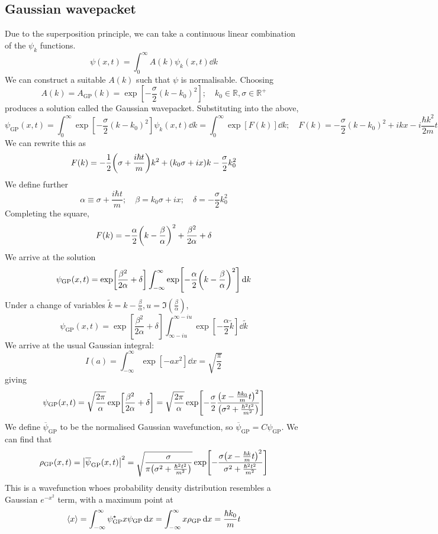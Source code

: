 \subsection{Gaussian wavepacket}
Due to the superposition principle, we can take a continuous linear combination of the \( \psi_k \) functions.
\[
	\psi(x,t) = \int_0^\infty A(k) \psi_k(x,t) \dd{k}
\]
We can construct a suitable \( A(k) \) such that \( \psi \) is normalisable.
Choosing
\[
	A(k) = A_{\text{GP}}(k) = \exp[-\frac{\sigma}{2}(k-k_0)^2];\quad k_0 \in \mathbb R, \sigma \in \mathbb R^+
\]
produces a solution called the Gaussian wavepacket.
Substituting into the above,
\[
	\psi_{\text{GP}}(x,t) = \int_0^\infty \exp[-\frac{\sigma}{2}(k-k_0)^2] \psi_k(x,t) \dd{k} = \int_0^\infty \exp[F(k)] \dd{k};\quad F(k) = -\frac{\sigma}{2}(k-k_0)^2 + ikx - i \frac{\hbar k^2}{2m} t
\]
We can rewrite this as
\[
	F(k) = -\frac{1}{2}\qty(\sigma + \frac{i \hbar t}{m}) k^2 + (k_0 \sigma + ix)k - \frac{\sigma}{2} k_0^2
\]
We define further
\[
	\alpha \equiv \sigma + \frac{i \hbar t}{m};\quad \beta = k_0 \sigma + ix;\quad \delta = -\frac{\sigma}{2} k_0^2
\]
Completing the square,
\[
	F(k) = -\frac{\alpha}{2} \qty(k - \frac{\beta}{\alpha})^2 + \frac{\beta^2}{2\alpha} + \delta
\]
We arrive at the solution
\[
	\psi_{\text{GP}}(x,t) = \exp[\frac{\beta^2}{2\alpha} + \delta] \int_{-\infty}^\infty \exp[-\frac{\alpha}{2}\qty(k - \frac{\beta}{\alpha})^2 ] \dd{k}
\]
Under a change of variables \( \widetilde k = k - \frac{\beta}{\alpha}, u = \Im(\frac{\beta}{\alpha}) \),
\[
	\psi_{\text{GP}}(x,t) = \exp[\frac{\beta^2}{2\alpha} + \delta] \int_{\infty - iu}^{\infty - iu} \exp[-\frac{\alpha}{2} \widetilde k] \dd{\widetilde k}
\]
We arrive at the usual Gaussian integral:
\[
	I(a) = \int_{-\infty}^\infty \exp[-a x^2] \dd{x} = \sqrt{\frac{\pi}{2}}
\]
giving
\[
	\psi_{\text{GP}}(x,t) = \sqrt{\frac{2 \pi}{\alpha}} \exp[\frac{\beta^2}{2\alpha} + \delta] = \sqrt{\frac{2\pi}{\alpha}} \exp[-\frac{\sigma}{2} \frac{\qty(x - \frac{\hbar k_0}{m} t)^2}{\qty(\sigma^2 + \frac{\hbar^2 t^2}{m^2} )} ]
\]
We define \( \overline \psi_{\text{GP}} \) to be the normalised Gaussian wavefunction, so \( \overline \psi_{\text{GP}} = C \psi_{\text{GP}} \).
We can find that
\[
	\rho_{\text{GP}}(x,t) = \abs{\overline \psi_{\text{GP}}(x,t)}^2 = \sqrt{\frac{\sigma}{\pi \qty(\sigma^2 + \frac{\hbar^2 t^2}{m^2})}} \exp[ - \frac{\sigma\qty(x - \frac{\hbar k}{m} t)^2}{\sigma^2 + \frac{\hbar^2 t^2}{m^2}} ]
\]
This is a wavefunction whoes probability density distribution resembles a Gaussian \( e^{-x^2} \) term, with a maximum point at
\[
	\left\langle{x}\right\rangle = \int_{-\infty}^\infty \psi_{\text{GP}}^\star x \psi_{\text{GP}} \dd{x} = \int_{-\infty}^\infty x \rho_{\text{GP}} \dd{x} = \frac{\hbar k_0}{m} t
\]
